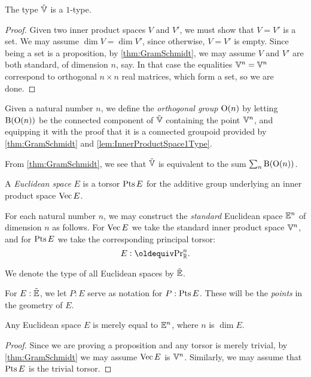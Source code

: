 \begin{lemma}\label{lem:InnerProductSpace1Type}
  The type ${\tilde {\mathbb V}}$ is a $1$-type.
\end{lemma}

\begin{proof}
  Given two inner product spaces $V$ and $V'$, we must show that $V=V'$ is a
  set.  We may assume $\dim V = \dim V'$, since otherwise, $V=V'$ is empty.
  Since being a set is a proposition, by \cref{thm:GramSchmidt}, we may assume
  $V$ and $V'$ are both standard, of dimension $n$, say.  In that case the
  equalities $\mathbb V^n = \mathbb V^n$ correspond to orthogonal $n \times n$ real
  matrices, which form a set, so we are done.
\end{proof}

\begin{definition}\label{def:OrthogonalGroup}
  Given a natural number $n$, we define the {\em orthogonal group} $\mathrm O(n)$
  by letting $\mathrm B (\mathrm O(n))$ be the connected component of ${\tilde {\mathbb V}}$ containing
  the point $\mathbb V^n$, and equipping it with the proof that it is a connected
  groupoid provided by \cref{thm:GramSchmidt} and
  \cref{lem:InnerProductSpace1Type}.
\end{definition}

From \cref{thm:GramSchmidt}, we see that ${\tilde {\mathbb V}}$ is equivalent to the sum
$\sum_n \mathrm B (\mathrm O(n))$.

\begin{definition}\label{def:EuclideanSpace}
  A {\em Euclidean space} $E$ is a torsor $\operatorname{Pts} E$ for the additive group
  underlying an inner product space $\operatorname{Vec} E$.
\end{definition}

For each natural number $n$, we may construct the {\em standard} Euclidean
space $\mathbb E^n$ of dimension $n$ as follows.  For $\operatorname{Vec} E$ we take the
standard inner product space $\mathbb V^n$, and for $\operatorname{Pts} E$ we take the
corresponding principal torsor:
$$ E \defeq \princ \RR^n. $$

We denote the type of all Euclidean spaces by ${\tilde {\mathbb E}}$.

For $E:{\tilde {\mathbb E}}$, we let $P:E$ serve as notation for $P:\operatorname{Pts} E$.  These will be
the {\em points} in the geometry of $E$.

\begin{theorem}\label{thm:EuclideanNormalization}
  Any Euclidean space $E$ is merely equal to $\mathbb E^n$, where $n$ is $\dim E$.
\end{theorem}

\begin{proof}
  Since we are proving a proposition and any torsor is merely trivial, by
  \cref{thm:GramSchmidt} we may assume $\operatorname{Vec} E$ is $\mathbb V^n$.  Similarly, we
  may assume that $\operatorname{Pts} E$ is the trivial torsor.
\end{proof}

